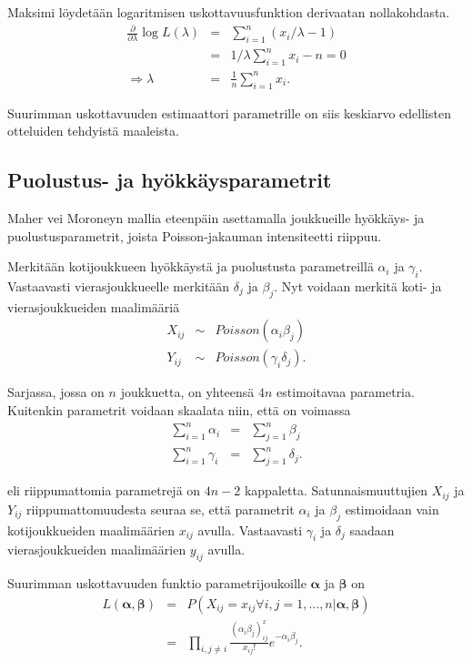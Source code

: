 \documentclass[a4paper,finnish,titlepage,12pt]{article}
\begin{document}
Maksimi löydetään logaritmisen uskottavuusfunktion derivaatan nollakohdasta.
\begin{eqnarray}
	\frac{\partial}{\partial \lambda} \log{L(\lambda)} &=& \sum_{i=1}^{n} (x_i / \lambda - 1) \\
	&=& 1 / \lambda \sum_{i=1}^{n} x_i - n = 0 \\
	\Rightarrow \lambda &=& \frac{1}{n} \sum_{i=1}^{n} x_i.
\end{eqnarray}

Suurimman uskottavuuden estimaattori parametrille on siis keskiarvo edellisten otteluiden tehdyistä maaleista. 

\subsection{Puolustus- ja hyökkäysparametrit}
Maher \cite{maher} vei Moroneyn mallia eteenpäin asettamalla joukkueille hyökkäys- ja puolustusparametrit, joista Poisson-jakauman intensiteetti riippuu. 

Merkitään kotijoukkueen hyökkäystä ja puolustusta parametreillä $\alpha_i$ ja $\gamma_i$. Vastaavasti vierasjoukkueelle merkitään $\delta_j$ ja $\beta_j$. Nyt voidaan merkitä koti- ja vierasjoukkueiden maalimääriä
\begin{eqnarray}
	X_{ij} &\sim& Poisson(\alpha_i \beta_j) \\
	Y_{ij} &\sim& Poisson(\gamma_i \delta_j).
\end{eqnarray}

Sarjassa, jossa on $n$ joukkuetta, on yhteensä $4n$ estimoitavaa parametria. Kuitenkin parametrit voidaan skaalata niin, että on voimassa
\begin{eqnarray}
	\sum_{i=1}^{n} \alpha_i &=& \sum_{j=1}^{n} \beta_j \\
	\sum_{i=1}^{n} \gamma_i &=& \sum_{j=1}^{n} \delta_j.
\end{eqnarray}

eli riippumattomia parametrejä on $4n - 2$ kappaletta. Satunnaismuuttujien $X_{ij}$ ja $Y_{ij}$ riippumattomuudesta seuraa se, että parametrit $\alpha_i$ ja $\beta_j$ estimoidaan vain kotijoukkueiden maalimäärien $x_{ij}$ avulla. Vastaavasti $\gamma_i$ ja $\delta_j$ saadaan vierasjoukkueiden maalimäärien $y_{ij}$ avulla.

Suurimman uskottavuuden funktio parametrijoukoille $\mathbf{\alpha}$ ja $\mathbf{\beta}$ on
\begin{eqnarray*}
	L(\mathbf{\alpha}, \mathbf{\beta}) &=& P(X_{ij}=x_{ij} \forall i,j=1,...,n | \mathbf{\alpha}, \mathbf{\beta}) \\
	&=& \prod_{i,j \ne i} \frac{(\alpha_i \beta_j)^x_{ij}}{x_{ij}!} e^{-\alpha_i \beta_j}.
\end{eqnarray*}
\end{document}
